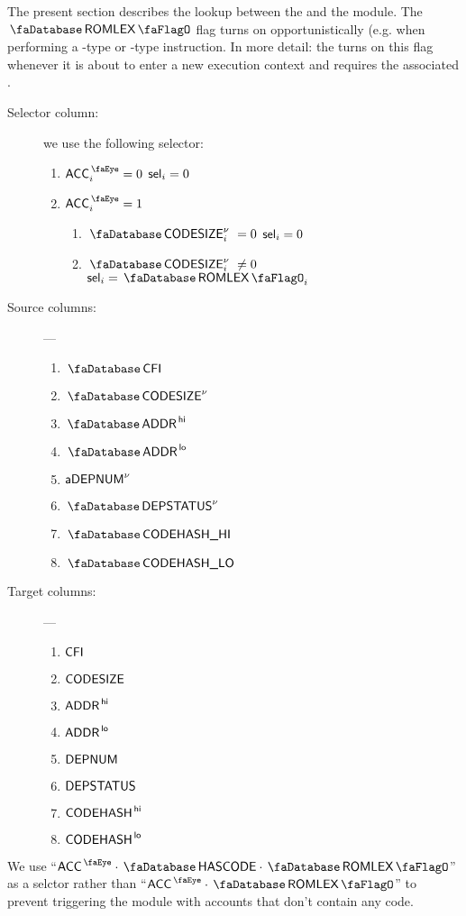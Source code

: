 The present section describes the lookup between the \hubMod{} and the \romLexMod{} module.
The $\accRomLexFlag$ flag turns on opportunistically (e.g. when performing a -type or -type instruction.
In more detail: the \zkEvm{} turns on this flag whenever it is about to enter a new execution context and requires the associated \cfi{}. 
\begin{description}
	\item[Selector column:] we use the following selector:
		\begin{enumerate}
			\item \If $\peekAccount _{i} = 0$ \Then $\textsf{sel} _{i} = 0$
			\item \If $\peekAccount _{i} = 1$ \Then
				\begin{enumerate}
				        \item \If $\accCodesize\new _{i} =    0$ \Then $\textsf{sel} _{i} = 0$
					\item \If $\accCodesize\new _{i} \neq 0$ \Then $\col{sel} _{i} = \accRomLexFlag _{i}$
				\end{enumerate}
		\end{enumerate}
	\item[Source columns:] ---
		\begin{multicols}{4}
			\begin{enumerate}
				\item $\accCfi$
				\item $\accCodesize\new$
				\item $\accAddressHi$
				\item $\accAddressLo$
				\item $\textsf{a}\textsf{DEPNUM}^{\nu}$
				\item $\accDeploymentStatus\new$
				\item $\accCodehashHi$
				\item $\accCodehashLo$
			\end{enumerate}
		\end{multicols}
	\item[Target columns:] ---
		\begin{multicols}{4}
			\begin{enumerate}
				\item $\textsf{CFI}$
				\item $\textsf{CODESIZE}$
				\item $\textsf{ADDR}^{\mathsf{\,hi}}$
				\item $\textsf{ADDR}^{\mathsf{\,lo}}$
				\item $\textsf{DEPNUM}$
				\item $\textsf{DEPSTATUS}$
				\item $\textsf{CODEHASH}^{\mathsf{\,hi}}$
				\item $\textsf{CODEHASH}^{\mathsf{\,lo}}$
			\end{enumerate}
		\end{multicols}
\end{description}
\saNote{} We use ``$\peekAccount \cdot \accHasCode \cdot \accRomLexFlag$'' as a selctor rather than ``$\peekAccount \cdot \accRomLexFlag$'' to prevent triggering the \romLexMod{} module with accounts that don't contain any code.
